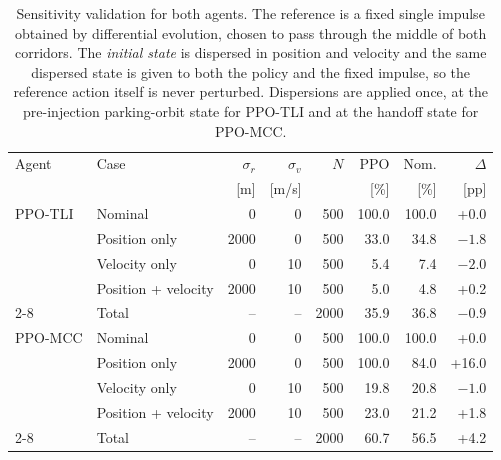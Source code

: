 \begin{table}[hbt!]
\centering
\small
\caption{Sensitivity validation for both agents. The reference is a fixed single impulse obtained by differential evolution, chosen to pass through the middle of both corridors. The \emph{initial state} is dispersed in position and velocity and the same dispersed state is given to both the policy and the fixed impulse, so the reference action itself is never perturbed. Dispersions are applied once, at the pre-injection parking-orbit state for PPO-TLI and at the handoff state for PPO-MCC.}
\label{tab:sensitivity}
\begin{tabular}{llrrrrrr}
\toprule
Agent & Case & $\sigma_r$ & $\sigma_v$ & $N$ & PPO & Nom. & $\Delta$ \\
 & & [m] & [m/s] & & [\%] & [\%] & [pp] \\
\midrule
PPO-TLI & Nominal & 0 & 0 & 500 & 100.0 & 100.0 & +0.0 \\
 & Position only & 2000 & 0 & 500 & 33.0 & 34.8 & $-1.8$ \\
 & Velocity only & 0 & 10 & 500 & 5.4 & 7.4 & $-2.0$ \\
 & Position + velocity & 2000 & 10 & 500 & 5.0 & 4.8 & +0.2 \\
\cmidrule(l){2-8}
 & Total & -- & -- & 2000 & 35.9 & 36.8 & $-0.9$ \\
\midrule
PPO-MCC & Nominal & 0 & 0 & 500 & 100.0 & 100.0 & +0.0 \\
 & Position only & 2000 & 0 & 500 & 100.0 & 84.0 & +16.0 \\
 & Velocity only & 0 & 10 & 500 & 19.8 & 20.8 & $-1.0$ \\
 & Position + velocity & 2000 & 10 & 500 & 23.0 & 21.2 & +1.8 \\
\cmidrule(l){2-8}
 & Total & -- & -- & 2000 & 60.7 & 56.5 & +4.2 \\
\bottomrule
\end{tabular}
\end{table}